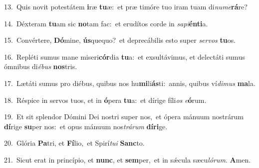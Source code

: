 {\numbfont\textcolor{\numbcolor}{13.}}~Quis novit potestátem \textbf{i}\-ræ \textbf{tu}\-æ:~\star et præ timóre tuo iram tuam di\-\textit{nu}\-\textit{me}\textbf{rá}re?\par
{\numbfont\textcolor{\numbcolor}{14.}}~Déxteram \textbf{tu}\-am sic \textbf{no}\-tam fac:~\star et erudítos corde in \textit{sa}\-\textit{pi}\textbf{én}\textbf{ti}a.\par
{\numbfont\textcolor{\numbcolor}{15.}}~Convértere, \textbf{Dó}\-mine, \textbf{ús}\-quequo?~\star et deprecábilis esto super \textit{ser}\-\textit{vos} \textbf{tu}\-os.\par
{\numbfont\textcolor{\numbcolor}{16.}}~Repléti sumus mane miseri\-\textbf{cór}\-dia \textbf{tu}\-a:~\star et exsultávimus, et delectáti sumus ómnibus di\-\textit{é}\-\textit{bus} \textbf{nos}\-tris.\par
{\numbfont\textcolor{\numbcolor}{17.}}~Lætáti sumus pro diébus, quibus nos hu\-\textbf{mi}\-li\-\textbf{ás}\-ti:~\star annis, quibus ví\-\textit{di}\-\textit{mus} \textbf{ma}\-la.\par
{\numbfont\textcolor{\numbcolor}{18.}}~Réspice in servos tuos, et in \textbf{ó}\-pera \textbf{tu}\-a:~\star et dírige fíli\textit{os} \textit{e}\-\textbf{ó}rum.\par
{\numbfont\textcolor{\numbcolor}{19.}}~Et sit splendor Dómini Dei nostri super nos,~\dagger et ópera mánuum nostrárum \textbf{dí}\-rige \textbf{su}\-per nos:~\star et opus mánuum nos\-\textit{trá}\-\textit{rum} \textbf{dí}\-\textbf{ri}ge.\par
{\numbfont\textcolor{\numbcolor}{20.}}~Glória \textbf{Pa}\-tri, et \textbf{Fí}\-lio,~\star et Spirí\-\textit{tu}\-\textit{i} \textbf{Sanc}\-to.\par
{\numbfont\textcolor{\numbcolor}{21.}}~Sicut erat in princípio, et \textbf{nunc}\-, et \textbf{sem}\-per,~\star et in sǽcula sæcu\-\textit{ló}\-\textit{rum}. \textbf{A}\-men.\par
